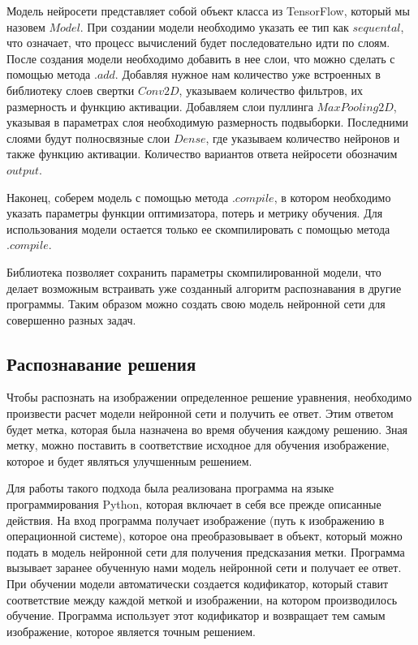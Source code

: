 \documentclass[12pt, a4paper]{article}
\begin{document}
 Модель нейросети представляет собой объект класса из TensorFlow, который мы назовем $Model$. При создании модели необходимо указать ее тип как $sequental$, что означает, что процесс вычислений будет последовательно идти по слоям. После создания модели необходимо добавить в нее слои, что можно сделать с помощью метода $.add$. Добавляя нужное нам количество уже встроенных в библиотеку слоев свертки $Conv2D$, указываем количество фильтров, их размерность и функцию активации. Добавляем слои пуллинга $MaxPooling2D$, указывая в параметрах слоя необходимую размерность подвыборки. Последними слоями будут полносвязные слои $Dense$, где указываем количество нейронов и также функцию активации. Количество вариантов ответа нейросети обозначим $output$.
 
  Наконец, соберем модель с помощью метода $.compile$, в котором необходимо указать параметры функции оптимизатора, потерь и метрику обучения.  Для использования модели остается только ее скомпилировать с помощью метода $.compile$. 
 
 Библиотека позволяет сохранить параметры скомпилированной модели, что делает возможным встраивать уже созданный алгоритм распознавания в другие программы. Таким образом можно создать свою модель нейронной сети для совершенно разных задач.
 
  
 
 
\subsection{Распознавание решения}

Чтобы распознать на изображении определенное решение уравнения, необходимо произвести расчет модели нейронной сети и получить ее ответ. Этим ответом будет метка, которая была назначена во время обучения каждому решению. Зная метку, можно поставить в соответствие исходное для обучения изображение, которое и будет являться улучшенным решением. 

Для работы такого подхода была реализована программа на языке программирования Python, которая включает в себя все прежде описанные действия. На вход программа получает изображение (путь к изображению в операционной системе), которое она преобразовывает в объект, который можно подать в модель нейронной сети для получения предсказания метки. Программа вызывает заранее обученную нами модель нейронной сети и получает ее ответ. При обучении модели автоматически создается кодификатор, который ставит соответствие между каждой меткой и изображении, на котором производилось обучение. Программа использует этот кодификатор и возвращает тем самым изображение, которое является точным решением.
\end{document}

